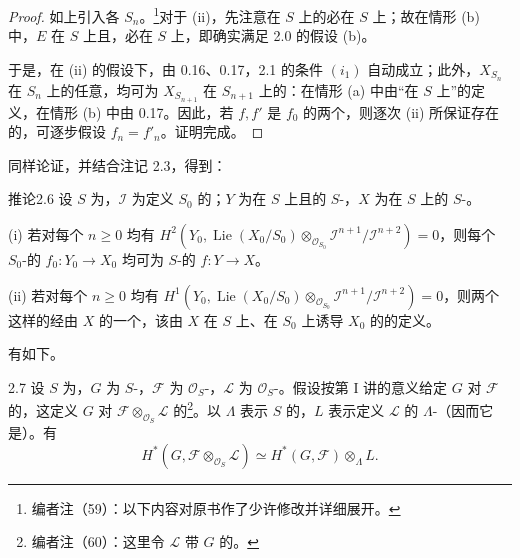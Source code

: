 \begin{proof}
如上引入各 $S_n$。\footnote{编者注（59）：以下内容对原书作了少许修改并详细展开。}对于 (ii)，先注意在 $S$ 上的必在 $S$ 上；故在情形 (b) 中，$E$ 在 $S$ 上且，必在 $S$ 上，即确实满足 2.0 的假设 (b)。

于是，在 (ii) 的假设下，由 0.16、0.17，2.1 的条件 $(i_1)$ 自动成立；此外，$X_{S_n}$ 在 $S_n$ 上的任意，均可为 $X_{S_{n+1}}$ 在 $S_{n+1}$ 上的：在情形 (a) 中由“在 $S$ 上”的定义，在情形 (b) 中由 0.17。因此，若 $f,f'$ 是 $f_0$ 的两个，则逐次 (ii) 所保证存在的，可逐步假设 $f_n=f'_n$。证明完成。
\end{proof}
同样论证，并结合注记 2.3，得到：
\begin{SGAresult}{推论}{2.6}
设 $S$ 为，$\mathcal I$ 为定义 $S_0$ 的；$Y$ 为在 $S$ 上且的 $S$-，$X$ 为在 $S$ 上的 $S$-。

(i) 若对每个 $n\geq0$ 均有 $H^2(Y_0,\operatorname{Lie}(X_0/S_0)\otimes_{\mathcal O_{S_0}}\mathcal I^{n+1}/\mathcal I^{n+2})=0$，则每个 $S_0$-的 $f_0:Y_0\to X_0$ 均可为 $S$-的 $f:Y\to X$。

(ii) 若对每个 $n\geq0$ 均有 $H^1(Y_0,\operatorname{Lie}(X_0/S_0)\otimes_{\mathcal O_{S_0}}\mathcal I^{n+1}/\mathcal I^{n+2})=0$，则两个这样的经由 $X$ 的一个，该由 $X$ 在 $S$ 上、在 $S_0$ 上诱导 $X_0$ 的的定义。
\end{SGAresult}
有如下。
\begin{SGAresult}{}{2.7}
设 $S$ 为，$G$ 为 $S$-，$\mathcal F$ 为 $\mathcal O_S$-，$\mathcal L$ 为 $\mathcal O_S$-。假设按第 I 讲的意义给定 $G$ 对 $\mathcal F$ 的，这定义 $G$ 对 $\mathcal F\otimes_{\mathcal O_S}\mathcal L$ 的\footnote{编者注（60）：这里令 $\mathcal L$ 带 $G$ 的。}。以 $\Lambda$ 表示 $S$ 的，$L$ 表示定义 $\mathcal L$ 的 $\Lambda$-（因而它是）。有
\[
 H^*(G,\mathcal F\otimes_{\mathcal O_S}\mathcal L)
 \simeq H^*(G,\mathcal F)\otimes_\Lambda L.
\]
\end{SGAresult}
